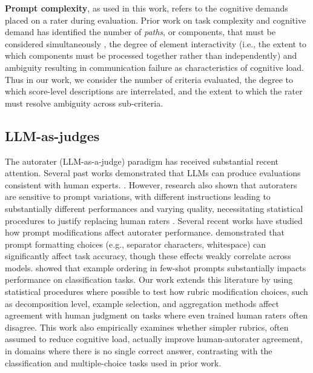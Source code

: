 

\textbf{Prompt complexity}, as used in this work, refers to the cognitive demands placed on a rater during evaluation. Prior work on task complexity and cognitive demand has identified the number of \textit{paths}, or components, that must be considered simultaneously \citep{8163de9b-fb12-3776-8b6f-4c14075da748}, the degree of element interactivity (i.e., the extent to which components must be processed together rather than independently) \citep{sweller_element_2010} and ambiguity resulting in communication failure \citep{8163de9b-fb12-3776-8b6f-4c14075da748} as characteristics of cognitive load. Thus in our work, we consider the number of criteria evaluated, the degree to which score-level descriptions are interrelated, and the extent to which the rater must resolve ambiguity across sub-criteria. 

\subsection{LLM-as-judges}

The autorater (LLM-as-a-judge) paradigm has received substantial recent attention. Several past works demonstrated that LLMs can produce evaluations consistent with human experts. \citep{chiang_can_2023, li-etal-2025-generation}. However, research also shown that autoraters are sensitive to prompt variations, with different instructions leading to substantially different performances \cite{mizrahi-etal-2024-state} and varying quality, necessitating statistical procedures to justify replacing human raters \cite{calderon-etal-2025-alternative}. Several recent works have studied how prompt modifications affect autorater performance. \citep{sclar2024quantifying} demonstrated that prompt formatting choices (e.g., separator characters, whitespace) can significantly affect task accuracy, though these effects weakly correlate across models. \citep{lu-etal-2022-fantastically} showed that example ordering in few-shot prompts substantially impacts performance on classification tasks. Our work extends this literature by using statistical procedures where possible to test how rubric modification choices, such as decomposition level, example selection, and aggregation methods affect agreement with human judgment on tasks where even trained human raters often disagree. This work also empirically examines whether simpler rubrics, often assumed to reduce cognitive load, actually improve human-autorater agreement, in domains where there is no single correct answer, contrasting with the classification and multiple-choice tasks used in prior work.

